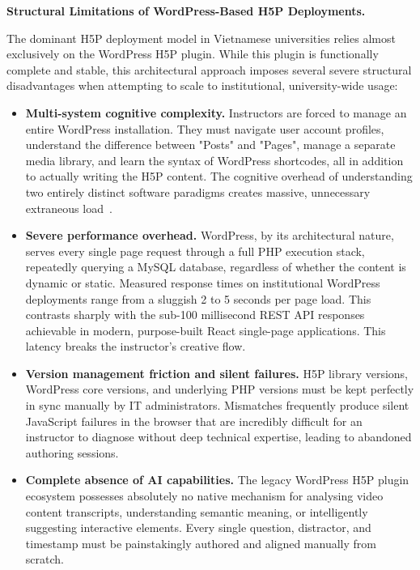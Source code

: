 \textbf{Structural Limitations of WordPress-Based H5P Deployments.}

The dominant H5P deployment model in Vietnamese universities relies almost exclusively on the WordPress H5P plugin. While this plugin is functionally complete and stable, this architectural approach imposes several severe structural disadvantages when attempting to scale to institutional, university-wide usage:

\begin{itemize}
  \item \textbf{Multi-system cognitive complexity.} Instructors are forced to manage an entire WordPress installation. They must navigate user account profiles, understand the difference between "Posts" and "Pages", manage a separate media library, and learn the syntax of WordPress shortcodes, all in addition to actually writing the H5P content. The cognitive overhead of understanding two entirely distinct software paradigms creates massive, unnecessary extraneous load~\cite{sweller1988}.
  \item \textbf{Severe performance overhead.} WordPress, by its architectural nature, serves every single page request through a full PHP execution stack, repeatedly querying a MySQL database, regardless of whether the content is dynamic or static. Measured response times on institutional WordPress deployments range from a sluggish 2 to 5 seconds per page load. This contrasts sharply with the sub-100 millisecond REST API responses achievable in modern, purpose-built React single-page applications. This latency breaks the instructor's creative flow.
  \item \textbf{Version management friction and silent failures.} H5P library versions, WordPress core versions, and underlying PHP versions must be kept perfectly in sync manually by IT administrators. Mismatches frequently produce silent JavaScript failures in the browser that are incredibly difficult for an instructor to diagnose without deep technical expertise, leading to abandoned authoring sessions.
  \item \textbf{Complete absence of AI capabilities.} The legacy WordPress H5P plugin ecosystem possesses absolutely no native mechanism for analysing video content transcripts, understanding semantic meaning, or intelligently suggesting interactive elements. Every single question, distractor, and timestamp must be painstakingly authored and aligned manually from scratch.
\end{itemize}

